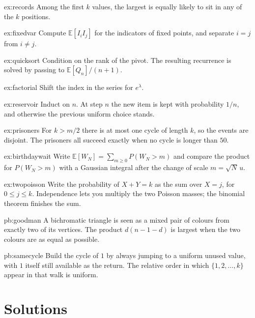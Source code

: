 \begin{hint}{ex:records}
Among the first $k$ values, the largest is equally likely to sit in any of the $k$ positions.
\end{hint}
\begin{hint}{ex:fixedvar}
Compute $\mathbb E[I_i I_j]$ for the indicators of fixed points, and separate $i=j$ from $i\ne j$.
\end{hint}
\begin{hint}{ex:quicksort}
Condition on the rank of the pivot. The resulting recurrence is solved by passing to $\mathbb E[Q_n]/(n+1)$.
\end{hint}
\begin{hint}{ex:factorial}
Shift the index in the series for $e^\lambda$.
\end{hint}
\begin{hint}{ex:reservoir}
Induct on $n$. At step $n$ the new item is kept with probability $1/n$, and otherwise the previous uniform choice stands.
\end{hint}
\begin{hint}{ex:prisoners}
For $k>m/2$ there is at most one cycle of length $k$, so the events are disjoint. The prisoners all succeed exactly when no cycle is longer than $50$.
\end{hint}
\begin{hint}{ex:birthdaywait}
Write $\mathbb E[W_N]=\sum_{m\ge0}P(W_N>m)$ and compare the product for $P(W_N>m)$ with a Gaussian integral after the change of scale $m=\sqrt N\,u$.
\end{hint}
\begin{hint}{ex:twopoisson}
Write the probability of $X+Y=k$ as the sum over $X=j$, for $0\le j\le k$. Independence lets you multiply the two Poisson masses; the binomial theorem finishes the sum.
\end{hint}


\begin{hint}{pb:goodman}
A bichromatic triangle is seen as a mixed pair of colours from exactly two of its vertices. The product $d(n-1-d)$ is largest when the two colours are as equal as possible.
\end{hint}
\begin{hint}{pb:samecycle}
Build the cycle of $1$ by always jumping to a uniform unused value, with $1$ itself still available as the return. The relative order in which $\{1,2,\ldots,k\}$ appear in that walk is uniform.
\end{hint}

\section{Solutions}

